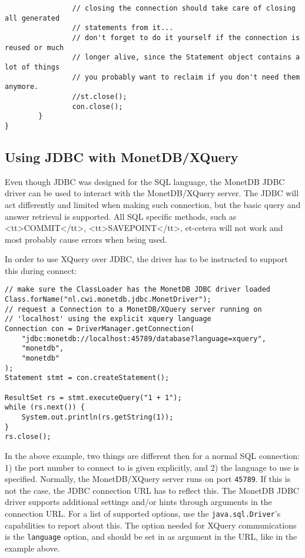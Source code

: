\documentclass{article}
\begin{document}
\begin{verbatim}
                // closing the connection should take care of closing all generated
                // statements from it...
                // don't forget to do it yourself if the connection is reused or much
                // longer alive, since the Statement object contains a lot of things
                // you probably want to reclaim if you don't need them anymore.
                //st.close();
                con.close();
        }
}
\end{verbatim}

\subsection{Using JDBC with MonetDB/XQuery}
Even though JDBC was designed for the SQL language, the MonetDB JDBC
driver can be used to interact with the MonetDB/XQuery server.  The JDBC
will act differently and limited when making such connection, but the
basic query and answer retrieval is supported.  All SQL specific
methods, such as <tt>COMMIT</tt>, <tt>SAVEPOINT</tt>, et-cetera will not
work and most probably cause errors when being used.

In order to use XQuery over JDBC, the driver has to be instructed to
support this during connect:
\begin{verbatim}
// make sure the ClassLoader has the MonetDB JDBC driver loaded
Class.forName("nl.cwi.monetdb.jdbc.MonetDriver");
// request a Connection to a MonetDB/XQuery server running on
// 'localhost' using the explicit xquery language
Connection con = DriverManager.getConnection(
    "jdbc:monetdb://localhost:45789/database?language=xquery",
    "monetdb",
    "monetdb"
);
Statement stmt = con.createStatement();

ResultSet rs = stmt.executeQuery("1 + 1");
while (rs.next()) {
	System.out.println(rs.getString(1));
}
rs.close();
\end{verbatim}
In the above example, two things are different then for a normal SQL
connection: 1) the port number to connect to is given explicitly, and 2)
the language to use is specified.  Normally, the MonetDB/XQuery server
runs on port \texttt{45789}.  If this is not the case, the JDBC
connection URL has to reflect this.  The MonetDB JDBC driver supports
additional settings and/or hints through arguments in the connection
URL.  For a list of supported options, use the
\texttt{java.sql.Driver}'s capabilities to report about this.  The
option needed for XQuery communications is the \texttt{language} option,
and should be set in as argument in the URL, like in the example above.
\end{document}
